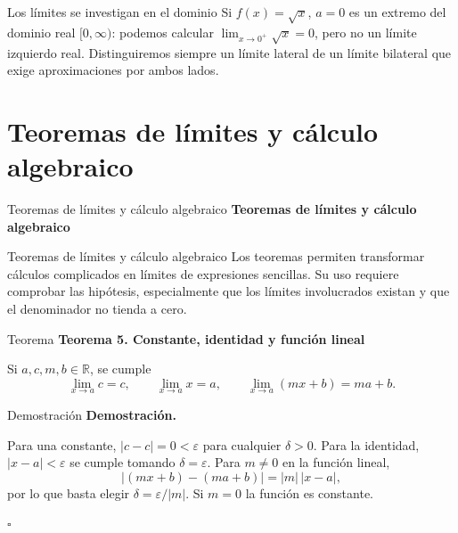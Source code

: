 \documentclass[12pt,aspectratio=169]{beamer}
\newcommand{\R}{\mathbb{R}}
\begin{document}
\begin{frame}[t,allowframebreaks]{Los límites se investigan en el dominio}
Si $f(x)=\sqrt{x}$, $a=0$ es un extremo del dominio real $[0,\infty)$: podemos calcular $\lim_{x\to0^+}\sqrt{x}=0$, pero no un límite izquierdo real. Distinguiremos siempre un límite lateral de un límite bilateral que exige aproximaciones por ambos lados.

\end{frame}


\section{Teoremas de límites y cálculo algebraico}

\begin{frame}[t]{Teoremas de límites y cálculo algebraico}
\centering\vfill{\Large\bfseries\color{azul} Teoremas de límites y cálculo algebraico}\vfill
\end{frame}


\begin{frame}[t,allowframebreaks]{Teoremas de límites y cálculo algebraico}
Los teoremas permiten transformar cálculos complicados en límites de expresiones sencillas. Su uso requiere comprobar las hipótesis, especialmente que los límites involucrados existan y que el denominador no tienda a cero.
\end{frame}


\begin{frame}[t,allowframebreaks]{Teorema}
{\color{azul}\bfseries Teorema 5. Constante, identidad y función lineal}\par\medskip

Si $a,c,m,b\in\R$, se cumple
\[
 \lim_{x\to a}c=c,\qquad \lim_{x\to a}x=a,\qquad
 \lim_{x\to a}(mx+b)=ma+b.
\]
\end{frame}


\begin{frame}[t,allowframebreaks]{Demostración}
{\color{azul}\bfseries Demostración.}\par\smallskip

Para una constante, $|c-c|=0<\varepsilon$ para cualquier $\delta>0$. Para la identidad, $|x-a|<\varepsilon$ se cumple tomando $\delta=\varepsilon$. Para $m\ne0$ en la función lineal,
\[
 |(mx+b)-(ma+b)|=|m|\,|x-a|,
\]
por lo que basta elegir $\delta=\varepsilon/|m|$. Si $m=0$ la función es constante.

\hfill $\square$
\end{frame}
\end{document}
